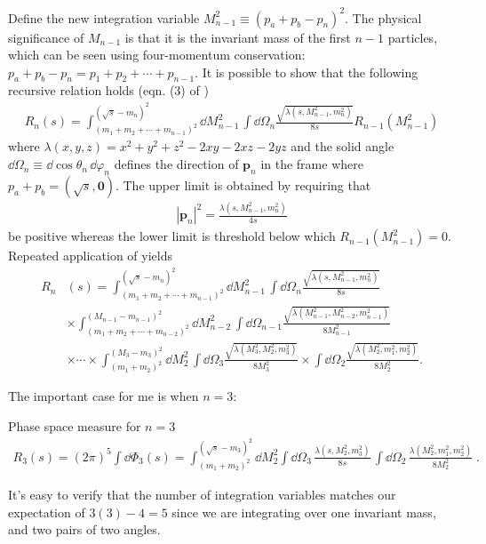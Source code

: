 Define the new integration variable $M_{n-1}^2 \equiv (p_a + p_b - p_n)^2$. The physical significance of $M_{n-1}$ is that it is the invariant mass of the first $n-1$ particles, which can be seen using four-momentum conservation: $p_a + p_b - p_n = p_1 + p_2 + \cdots + p_{n-1}$.
It is possible to show that the following recursive relation holds (eqn. (3) of \cite{Byckling:1969sx})
\begin{align}
    \label{eq:recursive-phase-space-relation}
    R_n(s) = 
    \int_{(m_1 + m_2 + \cdots + m_{n-1})^2}^{(\sqrt{s} - m_n)^2} 
    \dd M^2_{n-1} \, \int \dd \Omega_n
    \frac{\sqrt{\lambda(s, M_{n-1}^2, m_n^2)}}{8s} R_{n-1}(M_{n-1}^2)
\end{align}
where $\lambda(x, y, z) = x^2 + y^2 + z^2 - 2 xy - 2 xz - 2yz$ and the solid angle $\dd \Omega_n \equiv \dd \cos \theta_n\, \dd \varphi_n$ defines the direction of $\bm{p}_n$ in the frame where $p_a + p_b = (\sqrt{s}, \bm{0})$. 
The upper limit is obtained by requiring that 
\begin{align}
    |\bm{p}_n|^2 = \frac{\lambda(s, M_{n-1}^2, m_n^2)}{4 s}
\end{align}
be positive whereas the lower limit is threshold below which $R_{n-1}(M_{n-1}^2) = 0$\footnotemark. 
Repeated application of  yields 
\begin{equation}
\begin{aligned}
    R_n&(s) 
        = 
    \int_{(m_1 + m_2 + \cdots + m_{n-1})^2}^{(\sqrt{s} - m_n)^2}
    \dd M^2_{n-1} \,  \int \dd \Omega_n
    \frac{\sqrt{\lambda(s, M_{n-1}^2, m_n^2)}}{8s} \\
        &\times 
    \int_{(m_1 + m_2 + \cdots + m_{n-2})^2}^{(M_{n-1} - m_{n-1})^2}
    \dd M^2_{n-2}  \, \int \dd \Omega_{n-1}
    \frac{\sqrt{\lambda(M_{n-1}^2, M_{n-2}^2, m_{n-1}^2)}}{8M_{n-1}^2} \\
        &\times \cdots \times
    \int_{(m_1 + m_2)^2}^{(M_3 - m_3)^2}
    \dd M^2_{2}  \, \int \dd \Omega_{3}
    \frac{\sqrt{\lambda(M_{3}^2, M_{2}^2, m_{3}^2)}}{8M_{3}^2} 
    \times 
    \int \dd \Omega_2
    \frac{\sqrt{\lambda(M_{2}^2, m_1^2, m_{2}^2)}}{8M_{2}^2}. 
\end{aligned}
\end{equation}

The important case for me is when $n = 3$:
\begin{bluenv}{Phase space measure for $n = 3$}
    \vspace{-3ex}
    \begin{equation}
        \label{eq:recursive-LIPS-3}
    \begin{aligned}
        R_3(s) = (2\pi)^{5}\int \dd \Phi_3(s) = 
            \int_{(m_1 + m_2)^2}^{(\sqrt{s} - m_3)^2} \dd M_{2}^2 
            \int \dd \Omega_3 \,
            \frac{\lambda (s, M^2_{2}, m_3^2)}{8s} \,
            \int \dd \Omega_2 \,
            \frac{\lambda (M^2_2, m_1^2, m_2^2)}{8 M_2^2} \; .
    \end{aligned}
    \end{equation}
\end{bluenv}
It's easy to verify that the number of integration variables matches our expectation of $3(3) - 4 = 5$ since we are integrating over one invariant mass, and two pairs of two angles. 

